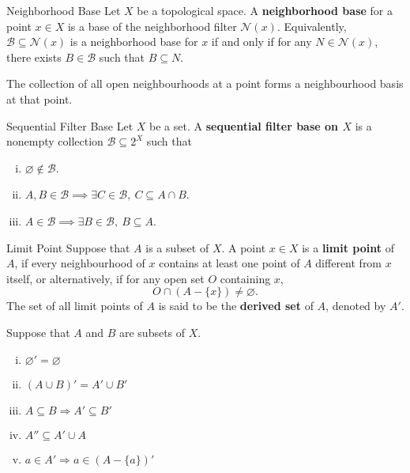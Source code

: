 \documentclass{report}
\begin{document}
\begin{definition}{Neighborhood Base}{}
	Let $X$ be a topological space. A \textbf{neighborhood base} for a point $x\in X$ is a base of the neighborhood filter $\mathcal{N}(x)$. Equivalently, $\mathcal{B}\subseteq\mathcal{N}(x)$ is a neighborhood base for $x$ if and only if for any $N\in\mathcal{N}(x)$, there exists $B\in\mathcal{B}$ such that $B\subseteq N$.
\end{definition}

\begin{proposition}{}{}
	The collection of all open neighbourhoods at a point forms a neighbourhood basis at that point.
\end{proposition}

\begin{definition}{Sequential Filter Base}{}
	Let $X$ be a set. A \textbf{sequential filter base on $X$} is a nonempty collection $\mathcal{B}\subseteq 2^X$ such that
	\begin{enumerate}[(i)]
		\item $\varnothing\notin\mathcal{B}$.
		\item $A,B\in\mathcal{B}\implies \exists C\in\mathcal{B},\ C\subseteq A\cap B$.
		\item $A\in\mathcal{B}\implies \exists B\in\mathcal{B},\ B\subseteq A$.
	\end{enumerate}
\end{definition}

\begin{definition}{Limit Point}{}
	Suppose that $A$ is a subset of $X$. A point $x\in X$ is a \textbf{limit point} of $A$, if every neighbourhood of $x$ contains at least one point of $A$ different from $x$ itself,
	or alternatively, if for any open set $O$ containing $x$,
	\[
		O\cap(A-\{x\})\ne\varnothing.
	\]
	The set of all limit points of $A$ is said to be the \textbf{derived set} of $A$, denoted by $A'$.
\end{definition}




\begin{proposition}{}{}
	Suppose that $A$ and $B$ are subsets of $X$.
	\begin{enumerate}[(i)]
		\item $\varnothing'=\varnothing$
		\item $(A \cup B)'=A'\cup B' $
		\item $A \subseteq B \Longrightarrow A' \subseteq B'$
		\item $A'' \subseteq A' \cup A $
		\item $a \in A' \Longrightarrow a \in(A-\{a\})' $
	\end{enumerate}
\end{proposition}
\end{document}

